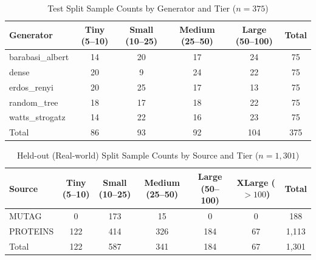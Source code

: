 \documentclass[11pt,letterpaper]{article}
\numberwithin{equation}{section}
\numberwithin{figure}{section}
\numberwithin{table}{section}
\begin{document}
\begin{table}[htbp]
\centering
\caption{Test Split Sample Counts by Generator and Tier ($n=375$)}
\label{tab:test_split_counts}
\begin{tabular}{lccccc}
\toprule
Generator & Tiny (5--10) & Small (10--25) & Medium (25--50) & Large (50--100) & Total \\
\midrule
barabasi\_albert & 14 & 20 & 17 & 24 & 75 \\
dense & 20 & 9 & 24 & 22 & 75 \\
erdos\_renyi & 20 & 25 & 17 & 13 & 75 \\
random\_tree & 18 & 17 & 18 & 22 & 75 \\
watts\_strogatz & 14 & 22 & 16 & 23 & 75 \\
\midrule
Total & 86 & 93 & 92 & 104 & 375 \\
\bottomrule
\end{tabular}
\end{table}

\begin{table}[htbp]
\centering
\caption{Held-out (Real-world) Split Sample Counts by Source and Tier ($n=1,301$)}
\label{tab:held_out_split_counts}
\small
\begin{tabular}{lcccccc}
\toprule
Source & Tiny (5--10) & Small (10--25) & Medium (25--50) & Large (50--100) & XLarge ($>100$) & Total \\
\midrule
MUTAG & 0 & 173 & 15 & 0 & 0 & 188 \\
PROTEINS & 122 & 414 & 326 & 184 & 67 & 1,113 \\
\midrule
Total & 122 & 587 & 341 & 184 & 67 & 1,301 \\
\bottomrule
\end{tabular}
\end{table}

\end{document}
